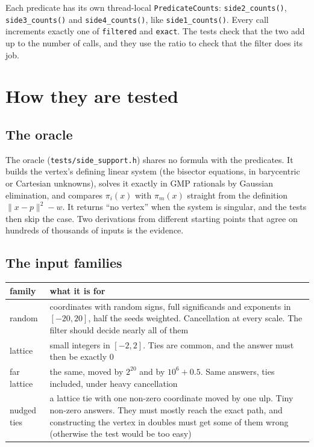 \documentclass[11pt,a4paper]{article}
\newcommand{\code}[1]{\texttt{#1}}
\newcommand{\norm}[1]{\lVert #1\rVert}
\theoremstyle{remark}
\begin{document}
Each predicate has its own thread-local \code{PredicateCounts}: \code{side2\_counts()},
\code{side3\_counts()} and \code{side4\_counts()}, like \code{side1\_counts()}. Every call
increments exactly one of \code{filtered} and \code{exact}. The tests check that the two add up
to the number of calls, and they use the ratio to check that the filter does its job.

\section{How they are tested}\label{sec:tests}

\subsection{The oracle}

The oracle (\code{tests/side\_support.h}) shares no formula with the predicates. It builds the
vertex's defining linear system (the bisector equations, in barycentric or Cartesian unknowns),
solves it exactly in GMP rationals by Gaussian elimination, and compares $\pi_i(x)$ with
$\pi_m(x)$ straight from the definition $\norm{x - p}^2 - w$. It returns ``no vertex'' when the
system is singular, and the tests then skip the case. Two derivations from different starting
points that agree on hundreds of thousands of inputs is the evidence.

\subsection{The input families}

\begin{center}
\begin{tabularx}{\linewidth}{@{}l L@{}}
\toprule
family & what it is for \\
\midrule
random & coordinates with random signs, full significands and exponents in $[-20, 20]$, half the
  seeds weighted. Cancellation at every scale. The filter should decide nearly all of them \\
lattice & small integers in $[-2,2]$. Ties are common, and the answer must then be exactly 0 \\
far lattice & the same, moved by $2^{20}$ and by $10^6 + 0.5$. Same answers, ties included,
  under heavy cancellation \\
nudged ties & a lattice tie with one non-zero coordinate moved by one ulp. Tiny non-zero
  answers. They must mostly reach the exact path, and constructing the vertex in doubles must get
  some of them wrong (otherwise the test would be too easy) \\
\bottomrule
\end{tabularx}
\end{center}
\end{document}
